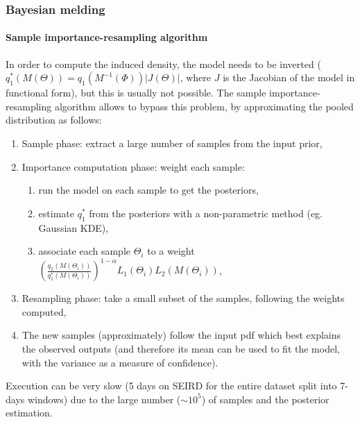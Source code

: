 \documentclass[aspectratio=43]{beamer}
\begin{document}
\begin{frame}
	\frametitle{Bayesian melding}
	\framesubtitle{Sample importance-resampling algorithm}
	In order to compute the induced density, the model needs to be inverted ($q_1^*(M(\Theta)) = q_1(M^{-1}(\Phi))|J(\Theta)|$, where $J$ is the Jacobian of the model in functional form), but this is usually not possible. The sample importance-resampling algorithm allows to bypass this problem, by approximating the pooled distribution as follows:
	\begin{enumerate}
		\item Sample phase: extract a large number of samples from the input prior,
		\item Importance computation phase: weight each sample:
		\begin{enumerate}
			\item run the model on each sample to get the posteriors,
			\item estimate $q_1^*$ from the posteriors with a non-parametric method (eg. Gaussian KDE),
			\item associate each sample $\Theta_i$ to a weight $(\frac{q_2(M(\Theta_i))}{q_1^*(M(\Theta_i))}) ^ {1-\alpha} L_1(\Theta_i) L_2(M(\Theta_i))$,
		\end{enumerate}
	\item Resampling phase: take a small subset of the samples, following the weights computed,
	\item The new samples (approximately) follow the input pdf which best explains the observed outputs (and therefore its mean can be used to fit the model, with the variance as a measure of confidence).
	\end{enumerate}
	
	Execution can be very slow (5 days on SEIRD for the entire dataset split into 7-days windows) due to the large number ($\sim 10^5$) of samples and the posterior estimation.
\end{frame}
\end{document}
